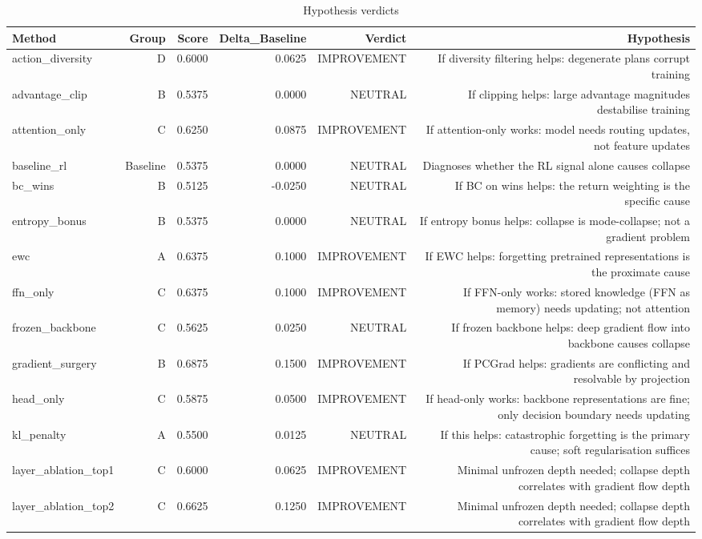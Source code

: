 \begin{table}[htbp]
\centering
\caption{Hypothesis verdicts}
\label{tab:hyp-verdicts}
\begin{tabular}{lrrrrr}
\toprule
\textbf{Method} & \textbf{Group} & \textbf{Score} & \textbf{Delta\_Baseline} & \textbf{Verdict} & \textbf{Hypothesis} \\
\midrule
action\_diversity & D & 0.6000 & 0.0625 & IMPROVEMENT & If diversity filtering helps: degenerate plans corrupt training \\
advantage\_clip & B & 0.5375 & 0.0000 & NEUTRAL & If clipping helps: large advantage magnitudes destabilise training \\
attention\_only & C & 0.6250 & 0.0875 & IMPROVEMENT & If attention-only works: model needs routing updates, not feature updates \\
baseline\_rl & Baseline & 0.5375 & 0.0000 & NEUTRAL & Diagnoses whether the RL signal alone causes collapse \\
bc\_wins & B & 0.5125 & -0.0250 & NEUTRAL & If BC on wins helps: the return weighting is the specific cause \\
entropy\_bonus & B & 0.5375 & 0.0000 & NEUTRAL & If entropy bonus helps: collapse is mode-collapse; not a gradient problem \\
ewc & A & 0.6375 & 0.1000 & IMPROVEMENT & If EWC helps: forgetting pretrained representations is the proximate cause \\
ffn\_only & C & 0.6375 & 0.1000 & IMPROVEMENT & If FFN-only works: stored knowledge (FFN as memory) needs updating; not attention \\
frozen\_backbone & C & 0.5625 & 0.0250 & NEUTRAL & If frozen backbone helps: deep gradient flow into backbone causes collapse \\
gradient\_surgery & B & 0.6875 & 0.1500 & IMPROVEMENT & If PCGrad helps: gradients are conflicting and resolvable by projection \\
head\_only & C & 0.5875 & 0.0500 & IMPROVEMENT & If head-only works: backbone representations are fine; only decision boundary needs updating \\
kl\_penalty & A & 0.5500 & 0.0125 & NEUTRAL & If this helps: catastrophic forgetting is the primary cause; soft regularisation suffices \\
layer\_ablation\_top1 & C & 0.6000 & 0.0625 & IMPROVEMENT & Minimal unfrozen depth needed; collapse depth correlates with gradient flow depth \\
layer\_ablation\_top2 & C & 0.6625 & 0.1250 & IMPROVEMENT & Minimal unfrozen depth needed; collapse depth correlates with gradient flow depth \\

\end{tabular}
\end{table}
